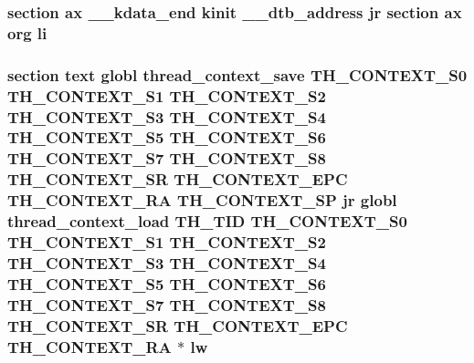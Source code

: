 \hypertarget{mips_2entry_8S_a4aae0b089c5269a564bd882bfc76d8de}{
\subsubsection[{li}]{\setlength{\rightskip}{0pt plus 5cm}section ax {\bf \-\_\-\-\_\-kdata\-\_\-end} {\bf kinit} \-\_\-\-\_\-dtb\-\_\-address jr section ax org li}}\label{mips_2entry_8S_a4aae0b089c5269a564bd882bfc76d8de}
\hypertarget{mips_2entry_8S_a470726200bc61516f5c1638535329434}{
\subsubsection[{lw}]{\setlength{\rightskip}{0pt plus 5cm}section text globl {\bf thread\-\_\-context\-\_\-save} {\bf T\-H\-\_\-\-C\-O\-N\-T\-E\-X\-T\-\_\-\-S0} {\bf T\-H\-\_\-\-C\-O\-N\-T\-E\-X\-T\-\_\-\-S1} {\bf T\-H\-\_\-\-C\-O\-N\-T\-E\-X\-T\-\_\-\-S2} {\bf T\-H\-\_\-\-C\-O\-N\-T\-E\-X\-T\-\_\-\-S3} {\bf T\-H\-\_\-\-C\-O\-N\-T\-E\-X\-T\-\_\-\-S4} {\bf T\-H\-\_\-\-C\-O\-N\-T\-E\-X\-T\-\_\-\-S5} {\bf T\-H\-\_\-\-C\-O\-N\-T\-E\-X\-T\-\_\-\-S6} {\bf T\-H\-\_\-\-C\-O\-N\-T\-E\-X\-T\-\_\-\-S7} {\bf T\-H\-\_\-\-C\-O\-N\-T\-E\-X\-T\-\_\-\-S8} {\bf T\-H\-\_\-\-C\-O\-N\-T\-E\-X\-T\-\_\-\-S\-R} {\bf T\-H\-\_\-\-C\-O\-N\-T\-E\-X\-T\-\_\-\-E\-P\-C} {\bf T\-H\-\_\-\-C\-O\-N\-T\-E\-X\-T\-\_\-\-R\-A} {\bf T\-H\-\_\-\-C\-O\-N\-T\-E\-X\-T\-\_\-\-S\-P} jr globl {\bf thread\-\_\-context\-\_\-load} {\bf T\-H\-\_\-\-T\-I\-D} {\bf T\-H\-\_\-\-C\-O\-N\-T\-E\-X\-T\-\_\-\-S0} {\bf T\-H\-\_\-\-C\-O\-N\-T\-E\-X\-T\-\_\-\-S1} {\bf T\-H\-\_\-\-C\-O\-N\-T\-E\-X\-T\-\_\-\-S2} {\bf T\-H\-\_\-\-C\-O\-N\-T\-E\-X\-T\-\_\-\-S3} {\bf T\-H\-\_\-\-C\-O\-N\-T\-E\-X\-T\-\_\-\-S4} {\bf T\-H\-\_\-\-C\-O\-N\-T\-E\-X\-T\-\_\-\-S5} {\bf T\-H\-\_\-\-C\-O\-N\-T\-E\-X\-T\-\_\-\-S6} {\bf T\-H\-\_\-\-C\-O\-N\-T\-E\-X\-T\-\_\-\-S7} {\bf T\-H\-\_\-\-C\-O\-N\-T\-E\-X\-T\-\_\-\-S8} {\bf T\-H\-\_\-\-C\-O\-N\-T\-E\-X\-T\-\_\-\-S\-R} {\bf T\-H\-\_\-\-C\-O\-N\-T\-E\-X\-T\-\_\-\-E\-P\-C} {\bf T\-H\-\_\-\-C\-O\-N\-T\-E\-X\-T\-\_\-\-R\-A} $\ast$ lw}}\label{mips_2entry_8S_a470726200bc61516f5c1638535329434}

